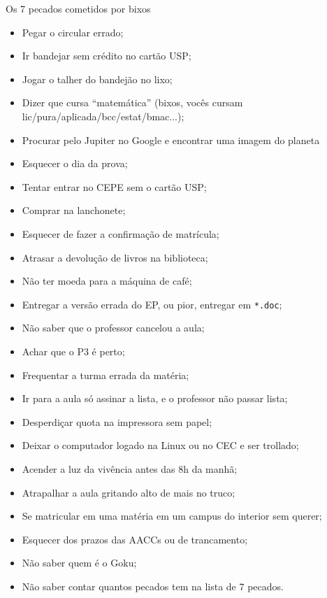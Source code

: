 \begin{editorial}{Os 7 pecados cometidos por bixos}

\begin{itemize}
  \item Pegar o circular errado;
  \item Ir bandejar sem crédito no cartão USP;
  \item Jogar o talher do bandejão no lixo;
  \item Dizer que cursa ``matemática'' (bixos, vocês cursam
        lic/pura/aplicada/bcc/estat/bmac...);
  \item Procurar pelo Jupiter no Google e encontrar uma imagem do planeta
  \item Esquecer o dia da prova;
  \item Tentar entrar no CEPE sem o cartão USP;
  \item Comprar na lanchonete;
  \item Esquecer de fazer a confirmação de matrícula;
  \item Atrasar a devolução de livros na biblioteca;
  \item Não ter moeda para a máquina de café;
  \item Entregar a versão errada do EP, ou pior, entregar em \texttt{*.doc};
  \item Não saber que o professor cancelou a aula;
  \item Achar que o P3 é perto;
  \item Frequentar a turma errada da matéria;
  \item Ir para a aula só assinar a lista, e o professor não passar lista;
  \item Desperdiçar quota na impressora sem papel;
  \item Deixar o computador logado na Linux ou no CEC e ser trollado;
  \item Acender a luz da vivência antes das 8h da manhã;
  \item Atrapalhar a aula gritando alto de mais no truco;
  \item Se matricular em uma matéria em um campus do interior sem querer;
  \item Esquecer dos prazos das AACCs ou de trancamento;
  \item Não saber quem é o Goku;
  \item Não saber contar quantos pecados tem na lista de 7 pecados.
\end{itemize}

\end{editorial}
